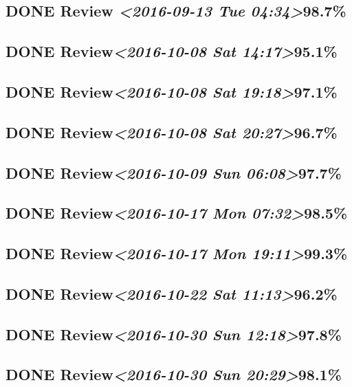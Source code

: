 \documentclass[11pt]{ctexart}
\begin{document}
\subsection{{\bfseries\sffamily DONE} Review \textit{<2016-09-13 Tue 04:34>}98.7\%}
\label{sec:org67cdfde}
\subsection{{\bfseries\sffamily DONE} Review\textit{<2016-10-08 Sat 14:17>}95.1\%}
\label{sec:org51d48c6}
\subsection{{\bfseries\sffamily DONE} Review\textit{<2016-10-08 Sat 19:18>}97.1\%}
\label{sec:org22bfd33}
\subsection{{\bfseries\sffamily DONE} Review\textit{<2016-10-08 Sat 20:27>}96.7\%}
\label{sec:org91cac4c}
\subsection{{\bfseries\sffamily DONE} Review\textit{<2016-10-09 Sun 06:08>}97.7\%}
\label{sec:org45adf9c}
\subsection{{\bfseries\sffamily DONE} Review\textit{<2016-10-17 Mon 07:32>}98.5\%}
\label{sec:org218b196}
\subsection{{\bfseries\sffamily DONE} Review\textit{<2016-10-17 Mon 19:11>}99.3\%}
\label{sec:orgb85d004}
\subsection{{\bfseries\sffamily DONE} Review\textit{<2016-10-22 Sat 11:13>}96.2\%}
\label{sec:org76b33d4}
\subsection{{\bfseries\sffamily DONE} Review\textit{<2016-10-30 Sun 12:18>}97.8\%}
\label{sec:orgc6c1cda}
\subsection{{\bfseries\sffamily DONE} Review\textit{<2016-10-30 Sun 20:29>}98.1\%}
\label{sec:org9308d52}
\end{document}
